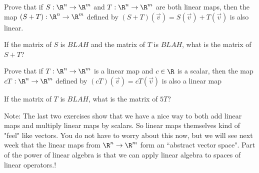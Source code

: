 \documentclass{article}
\begin{document}
	\begin{question}
		Prove that if $S:\R^n \to\R^m$ and $T:\R^n \to \R^m$ are both linear maps, 
		then the map $(S+T):\R^n \to\R^m$ defined by $(S+T)(\vec{v}) = S(\vec{v})+T(\vec{v})$ is also linear.
	\end{question}
	
	\begin{question}
		If the matrix of $S$ is $BLAH$ and the matrix of $T$ is $BLAH$, what is the matrix of $S+T$?
	\end{question}
	
	\begin{question}
		Prove that if $T:\R^n \to \R^m$ is a linear map and $c \in \R$ is a scalar, then the map $cT:\R^n \to \R^m$  defined by $(cT)(\vec{v}) = cT(\vec{v})$ is also 
		a linear map
	\end{question}
	
	\begin{question}
		If the matrix of $T$ is $BLAH$, what is the matrix of $5T$?
	\end{question}
	
	Note:  The last two exercises show that we have a nice way to both add linear maps and multiply linear maps by scalars.  So linear maps themselves kind of "feel" like
	vectors.  You do not have to worry about this now, but we will see next week that the linear maps from $\R^n \to \R^m$ form an ``abstract vector space".  Part of the 
	power of linear algebra is that we can apply linear algebra to spaces of linear operators.!	
	
\end{document}
